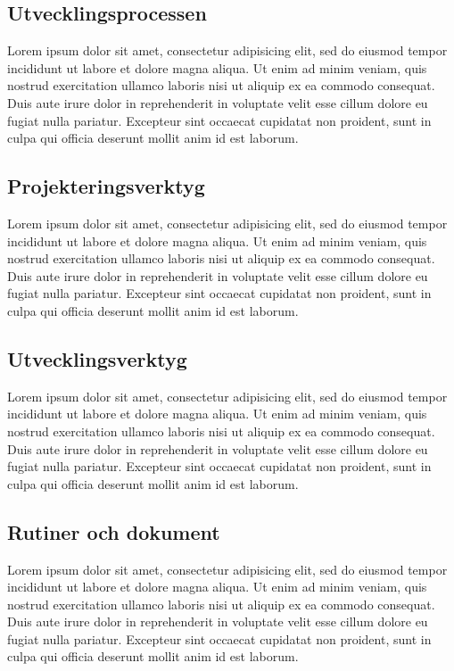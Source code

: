 \documentclass[a4paper,12pt,oneside,final]{extbook}
\begin{document}
\subsection{Utvecklingsprocessen}

Lorem ipsum dolor sit amet, consectetur adipisicing elit, sed do eiusmod tempor incididunt ut labore et dolore magna aliqua. Ut enim ad minim veniam, quis nostrud exercitation ullamco laboris nisi ut aliquip ex ea commodo consequat. Duis aute irure dolor in reprehenderit in voluptate velit esse cillum dolore eu fugiat nulla pariatur. Excepteur sint occaecat cupidatat non proident, sunt in culpa qui officia deserunt mollit anim id est laborum.

\subsection{Projekteringsverktyg}

Lorem ipsum dolor sit amet, consectetur adipisicing elit, sed do eiusmod tempor incididunt ut labore et dolore magna aliqua. Ut enim ad minim veniam, quis nostrud exercitation ullamco laboris nisi ut aliquip ex ea commodo consequat. Duis aute irure dolor in reprehenderit in voluptate velit esse cillum dolore eu fugiat nulla pariatur. Excepteur sint occaecat cupidatat non proident, sunt in culpa qui officia deserunt mollit anim id est laborum.

\subsection{Utvecklingsverktyg}

Lorem ipsum dolor sit amet, consectetur adipisicing elit, sed do eiusmod tempor incididunt ut labore et dolore magna aliqua. Ut enim ad minim veniam, quis nostrud exercitation ullamco laboris nisi ut aliquip ex ea commodo consequat. Duis aute irure dolor in reprehenderit in voluptate velit esse cillum dolore eu fugiat nulla pariatur. Excepteur sint occaecat cupidatat non proident, sunt in culpa qui officia deserunt mollit anim id est laborum.

\subsection{Rutiner och dokument}

Lorem ipsum dolor sit amet, consectetur adipisicing elit, sed do eiusmod tempor incididunt ut labore et dolore magna aliqua. Ut enim ad minim veniam, quis nostrud exercitation ullamco laboris nisi ut aliquip ex ea commodo consequat. Duis aute irure dolor in reprehenderit in voluptate velit esse cillum dolore eu fugiat nulla pariatur. Excepteur sint occaecat cupidatat non proident, sunt in culpa qui officia deserunt mollit anim id est laborum.
\end{document}
